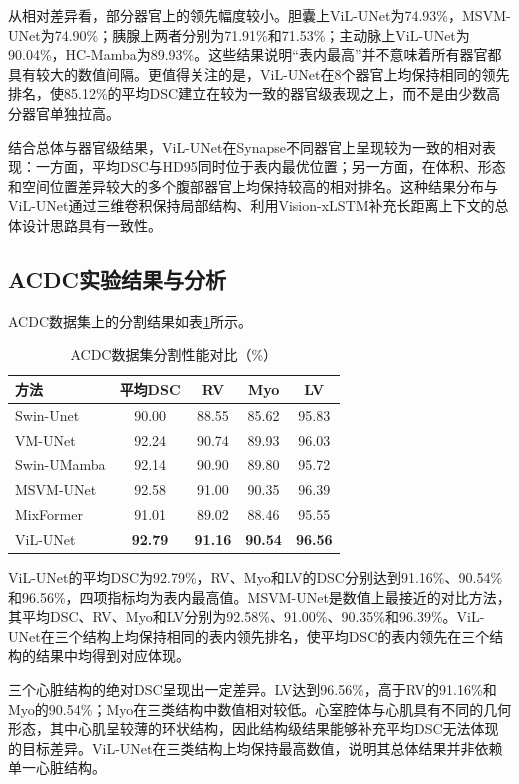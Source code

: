 从相对差异看，部分器官上的领先幅度较小。胆囊上ViL-UNet为74.93\%，MSVM-UNet为74.90\%；胰腺上两者分别为71.91\%和71.53\%；主动脉上ViL-UNet为90.04\%，HC-Mamba为89.93\%。这些结果说明“表内最高”并不意味着所有器官都具有较大的数值间隔。更值得关注的是，ViL-UNet在8个器官上均保持相同的领先排名，使85.12\%的平均DSC建立在较为一致的器官级表现之上，而不是由少数高分器官单独拉高。

结合总体与器官级结果，ViL-UNet在Synapse不同器官上呈现较为一致的相对表现：一方面，平均DSC与HD95同时位于表内最优位置；另一方面，在体积、形态和空间位置差异较大的多个腹部器官上均保持较高的相对排名。这种结果分布与ViL-UNet通过三维卷积保持局部结构、利用Vision-xLSTM补充长距离上下文的总体设计思路具有一致性。

\subsection{ACDC实验结果与分析}

ACDC数据集上的分割结果如表\ref{tab:ch3-acdc}所示。

\begin{table}[htbp]
  \centering
  \caption{ACDC数据集分割性能对比（\%）}
  \label{tab:ch3-acdc}
  \begin{tabular}{lcccc}
    \hline
    方法 & 平均DSC & RV & Myo & LV \\
    \hline
    Swin-Unet   & 90.00 & 88.55 & 85.62 & 95.83 \\
    VM-UNet     & 92.24 & 90.74 & 89.93 & 96.03 \\
    Swin-UMamba & 92.14 & 90.90 & 89.80 & 95.72 \\
    MSVM-UNet   & 92.58 & 91.00 & 90.35 & 96.39 \\
    MixFormer   & 91.01 & 89.02 & 88.46 & 95.55 \\
    ViL-UNet    & \textbf{92.79} & \textbf{91.16} & \textbf{90.54} & \textbf{96.56} \\
    \hline
  \end{tabular}
\end{table}

ViL-UNet的平均DSC为92.79\%，RV、Myo和LV的DSC分别达到91.16\%、90.54\%和96.56\%，四项指标均为表内最高值。MSVM-UNet是数值上最接近的对比方法，其平均DSC、RV、Myo和LV分别为92.58\%、91.00\%、90.35\%和96.39\%。ViL-UNet在三个结构上均保持相同的表内领先排名，使平均DSC的表内领先在三个结构的结果中均得到对应体现。

三个心脏结构的绝对DSC呈现出一定差异。LV达到96.56\%，高于RV的91.16\%和Myo的90.54\%；Myo在三类结构中数值相对较低。心室腔体与心肌具有不同的几何形态，其中心肌呈较薄的环状结构，因此结构级结果能够补充平均DSC无法体现的目标差异。ViL-UNet在三类结构上均保持最高数值，说明其总体结果并非依赖单一心脏结构。


